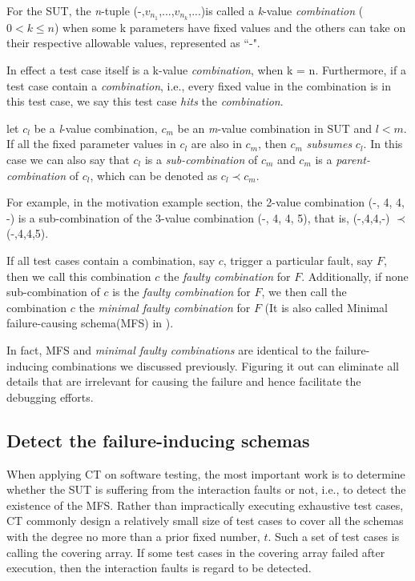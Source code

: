 \documentclass{sig-alternate}
\begin{document}
\begin{definition}
For the SUT, the \emph{n}-tuple (-,$v_{n_{1}}$,...,$v_{n_{k}}$,...)is called a \emph{k}-value \emph{combination} ($0 < k \leq n $) when some k parameters have fixed values and the others can take on their respective allowable values, represented as ``-".

In effect a test case itself is a k-value \emph{combination}, when k = n. Furthermore, if a test case contain a \emph{combination}, i.e., every fixed value in the combination is in this test case, we say this test case \emph{hits} the \emph{combination}.
\end{definition}

\begin{definition}
let $c_{l}$ be a \emph{l}-value combination, $c_{m}$ be an \emph{m}-value combination in SUT and $l < m$. If all the fixed parameter values in $c_{l}$ are also in $c_{m}$, then $c_{m}$ \emph{subsumes} $c_{l}$. In this case we can also say that $c_{l}$ is a \emph{sub-combination} of $c_{m}$ and $c_{m}$ is a \emph{parent-combination} of $c_{l}$, which can be denoted as $c_{l} \prec  c_{m}$.
\end{definition}

For example, in the motivation example section, the 2-value combination (-, 4, 4, -) is a sub-combination of the 3-value combination (-, 4, 4, 5), that is, (-,4,4,-) $\prec$ (-,4,4,5).

\begin{definition}
If all test cases contain a combination, say $c$, trigger a particular fault, say $F$, then we call this combination $c$ the \emph{faulty combination} for $F$. Additionally, if none sub-combination of $c$ is the \emph{faulty combination} for $F$, we then call the combination $c$ the \emph{minimal faulty combination} for $F$ (It is also called Minimal failure-causing schema(MFS) in ).

\end{definition}

In fact, MFS and \emph{minimal faulty combinations} are identical to the failure-inducing combinations we discussed previously. Figuring it out can eliminate all details that are irrelevant for causing the failure and hence facilitate the debugging efforts.

\subsection{Detect the failure-inducing schemas}
When applying CT on software testing, the most important work is to determine whether the SUT is suffering from the interaction faults or not, i.e., to  detect the existence of the MFS. Rather than impractically executing exhaustive test cases, CT commonly design a relatively small size of test cases to cover all the schemas with the degree no more than a prior fixed number, $t$. Such a set of test cases is calling the covering array.  If some test cases in the covering array failed after execution, then the interaction faults is regard to be detected.
\end{document}
